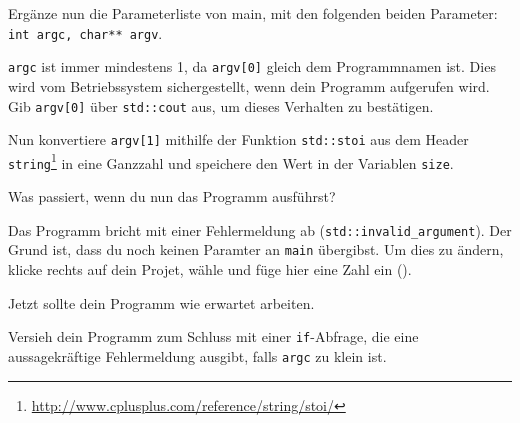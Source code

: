 Ergänze nun die Parameterliste von main, mit den folgenden beiden Parameter: \lstinline{int argc, char** argv}.

\lstinline{argc} ist immer mindestens 1, da \lstinline{argv[0]} gleich dem Programmnamen ist.
Dies wird vom Betriebssystem sichergestellt, wenn dein Programm aufgerufen wird.
Gib \lstinline{argv[0]} über \lstinline{std::cout} aus, um dieses Verhalten zu bestätigen.

Nun konvertiere \lstinline{argv[1]} mithilfe der Funktion \lstinline{std::stoi} aus dem Header \lstinline{string}\footnote{\url{http://www.cplusplus.com/reference/string/stoi/}} in eine Ganzzahl und speichere den Wert in der Variablen \lstinline{size}.

Was passiert, wenn du nun das Programm ausführst? 

Das Programm bricht mit einer Fehlermeldung ab (\lstinline{std::invalid_argument}).
Der Grund ist, dass du noch keinen Paramter an \lstinline{main} übergibst.
Um dies zu ändern, klicke rechts auf dein Projet, wähle  und füge hier eine Zahl ein ().

Jetzt sollte dein Programm wie erwartet arbeiten.

Versieh dein Programm zum Schluss mit einer \lstinline{if}-Abfrage, die eine aussagekräftige Fehlermeldung ausgibt, falls \lstinline{argc} zu klein ist.
